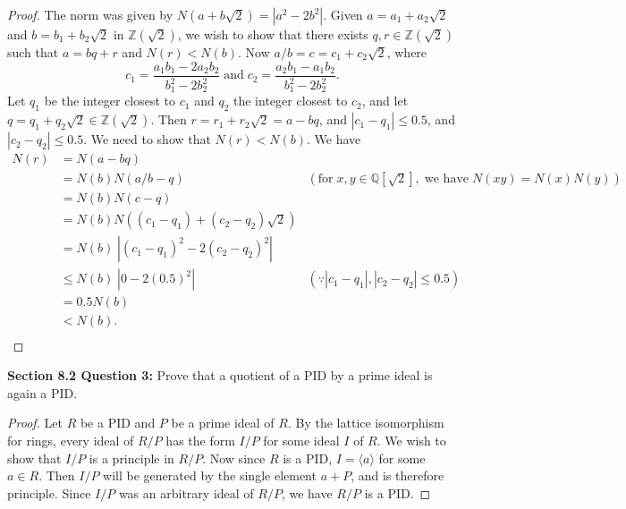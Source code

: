 \documentclass{article}
\begin{document}
  \begin{proof}
    The norm was given by $N(a+b\sqrt{2})=|a^2-2b^2|$. Given
    $a=a_1+a_2\sqrt{2}$ and $b=b_1+b_2\sqrt{2}$ in $\mathbb{Z}(\sqrt{2})$,
    we wish to show that there exists $q,r\in\mathbb{Z}(\sqrt{2})$ such
    that $a=bq+r$ and $N(r)<N(b)$. Now $a/b=c=c_1+c_2\sqrt{2}$, where
    \[c_1=\frac{a_1b_1-2a_2b_2}{b_1^2-2b_2^2}\; \text{and}\;
    c_2=\frac{a_2b_1-a_1b_2}{b_1^2-2b_2^2}.\] Let $q_1$ be the integer
    closest to $c_1$ and $q_2$ the integer closest to $c_2$, and let
    $q=q_1+q_2\sqrt{2}\in\mathbb{Z}(\sqrt{2})$. Then
    $r=r_1+r_2\sqrt{2}=a-bq$, and $|c_1-q_1|\leq0.5$, and
    $|c_2-q_2|\leq0.5$. We need to show that $N(r)<N(b)$. We have
    \begin{align*}
      N(r) &= N(a-bq) \\
        &=N(b)N(a/b-q) &(\text{for}\; x,y\in\mathbb{Q}[\sqrt{2}],\;
          \text{we have}\; N(xy)=N(x)N(y)) \\
        &=N(b)N(c-q) \\
        &=N(b)N\left((c_1-q_1)+(c_2-q_2)\sqrt{2}\right) \\
        &=N(b)\; \left|(c_1-q_1)^2-2(c_2-q_2)^2\right| \\
        &\leq N(b)\; \left|0-2(0.5)^2\right| &(\because
          |c_1-q_1|,|c_2-q_2|\leq0.5) \\
        &=0.5N(b) \\
        &<N(b). \\
    \end{align*}
  \end{proof}

\textbf{Section 8.2 Question 3:} Prove that a quotient of a PID by a prime
  ideal is again a PID.
  \begin{proof}
    Let $R$ be a PID and $P$ be a prime ideal of $R$.
    By the lattice isomorphism for rings, every ideal of $R/P$ has the form
    $I/P$ for some ideal $I$ of $R$. We wish to show that $I/P$ is a
    principle in $R/P$. Now since $R$ is a PID, $I=\langle a\rangle$ for
    some $a\in R$. Then $I/P$ will be generated by the single element
    $a+P$, and is therefore principle. Since $I/P$ was an arbitrary ideal of
    $R/P$, we have $R/P$ is a PID.
  \end{proof}
\end{document}
